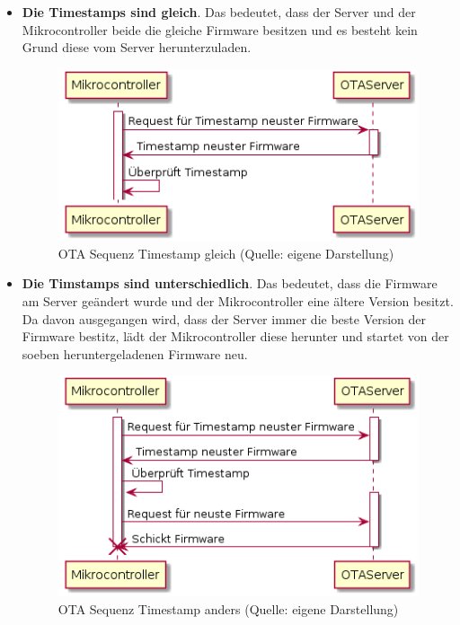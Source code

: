 \begin{itemize}
    \item \textbf{Die Timestamps sind gleich}. Das bedeutet, dass der Server und der Mikrocontroller beide die gleiche Firmware besitzen und es besteht kein Grund diese vom Server herunterzuladen.
    \begin{figure}[H]
        \begin{center}
            \includegraphics[scale=0.8]{diagrams/ota_sequence_same_timestamp.png}
            \caption{OTA Sequenz Timestamp gleich (Quelle: eigene Darstellung)}
        \end{center}
    \end{figure}
    \newpage
    \item \textbf{Die Timstamps sind unterschiedlich}. Das bedeutet, dass die Firmware am Server geändert wurde und der Mikrocontroller eine ältere Version besitzt.\newline
    Da davon ausgegangen wird, dass der Server immer die beste Version der Firmware bestitz, lädt der Mikrocontroller diese herunter und startet von der soeben heruntergeladenen Firmware neu.
    \begin{figure}[H]
        \begin{center}
            \includegraphics[scale=0.8]{diagrams/ota_sequence_different_timestamp.png}
            \caption{OTA Sequenz Timestamp anders (Quelle: eigene Darstellung)}
        \end{center}
    \end{figure}
\end{itemize}

